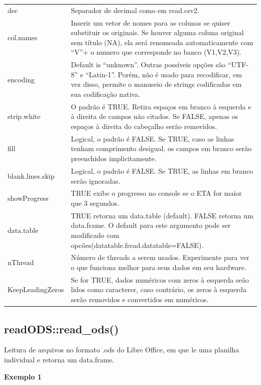 \documentclass[
]{book}
\theoremstyle{definition}
\theoremstyle{definition}
\theoremstyle{definition}
\theoremstyle{definition}
\theoremstyle{remark}
\begin{document}
\begin{longtable}[]{@{}
  >{\raggedright\arraybackslash}p{}
  >{\raggedright\arraybackslash}p{}@{}}
dec & Separador de decimal como em read.csv2. \\
col.names & Inserir um vetor de nomes para as colunas se quiser substituir os originais. Se houver alguma coluna original sem título (NA), ela será renomeada automaticamente com ``V''+ o numero que corresponde no banco (V1,V2,V3). \\
encoding & Default is ``unknown''. Outras possíveis opções são ``UTF-8'' e ``Latin-1''. Porém, não é usado para recodificar, em vez disso, permite o manuseio de strings codificadas em sua codificação nativa. \\
strip.white & O padrão é TRUE. Retira espaços em branco à esquerda e à direita de campos não citados. Se FALSE, apenas os espaços à direita do cabeçalho serão removidos. \\
fill & Logical, o padrão é FALSE. Se TRUE, caso as linhas tenham comprimento desigual, os campos em branco serão preenchidos implicitamente. \\
blank.lines.skip & Logical, o padrão é FALSE. Se TRUE, as linhas em branco serão ignoradas. \\
showProgress & TRUE exibe o progresso no console se o ETA for maior que 3 segundos. \\
data.table & TRUE retorna um data.table (default). FALSE retorna um data.frame. O default para este argumento pode ser modificado com opcões(datatable.fread.datatable=FALSE). \\
nThread & Número de threads a serem usados. Experimente para ver o que funciona melhor para seus dados em seu hardware. \\
KeepLeadingZeros & Se for TRUE, dados numéricos com zeros à esquerda seão lidos como caracterer, caso contrário, os zeros à esquerda serão removidos e convertidos em numéricos. \\
\bottomrule
\end{longtable}

\hypertarget{readodsread_ods}{%
\subsection{readODS::read\_ods()}\label{readodsread_ods}}

Leitura de arquivos no formato .ods do Libre Office, em que le uma planilha individual e retorna um data.frame.

\textbf{Exemplo 1}
\end{document}
